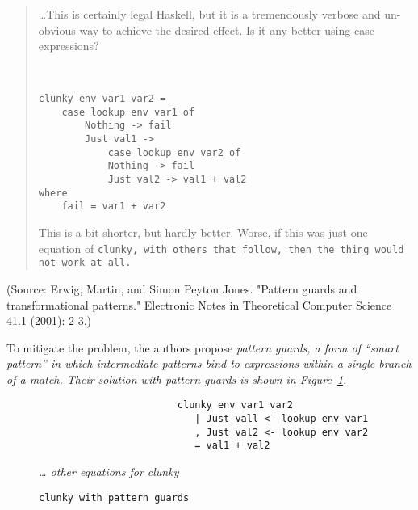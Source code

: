 \documentclass[manuscript,screen,review, 12pt]{acmart}
\begin{document}
\begin{outline}[enumerate]
\begin{quote}
    \dots This is certainly legal Haskell, but it is a tremendously verbose and
    un-obvious way to achieve the desired effect. Is it any better using case
    expressions?

    
        \begin{minipage}{\textwidth}
            \begin{verbatim}


clunky env var1 var2 = 
    case lookup env var1 of 
        Nothing -> fail 
        Just val1 -> 
            case lookup env var2 of 
            Nothing -> fail 
            Just val2 -> val1 + val2
where 
    fail = var1 + var2
            \end{verbatim}
        \end{minipage}
    
        This is a bit shorter, but hardly better. Worse, if this was just one
        equation of \tt{clunky}, with others that follow, then the thing would
        not work at all.

    \end{quote}

    (Source: Erwig, Martin, and Simon Peyton Jones. "Pattern guards and transformational patterns." Electronic Notes in Theoretical Computer Science 41.1 (2001): 2-3.)

        To mitigate the problem, the authors propose \it{pattern guards}, a form
        of “smart pattern” in which intermediate patterns bind to
        expressions within a single branch of a match. Their solution with
        pattern guards is shown in Figure~\ref{fig:guardclunky}. 

    \begin{figure}[hbt!]  
        \begin{center}
        \begin{verbatim}
                        clunky env var1 var2    
                           | Just vall <- lookup env var1
                           , Just val2 <- lookup env var2
                           = val1 + val2
        \end{verbatim}
        \it{… other equations for clunky}
        \end{center}    
    \caption{\tt{clunky} with pattern guards} 
    \label{fig:guardclunky}
    \end{figure}


\end{outline}
\end{document}
